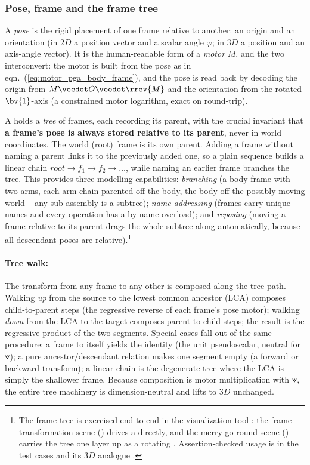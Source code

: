 \subsubsection{Pose, frame and the frame tree}
\label{subsubsection:pose_frame_tree}

A \emph{pose} is the rigid placement of one frame relative to another: an origin and an
orientation (in $2D$ a position vector and a scalar angle $\varphi$; in $3D$ a position
and an axis-angle vector). It is the human-readable form of a \emph{motor} $M$, and the
two interconvert: the motor is built from the pose as in
eqn.~(\ref{eq:motor_pga_body_frame}), and the pose is read back by decoding the origin
from $M \veedot O \veedot \rrev{M}$ and the orientation from the rotated $\bv{1}$-axis (a
constrained motor logarithm, exact on round-trip).

A  holds a \emph{tree} of frames, each recording its parent, with
the crucial invariant that \textbf{a frame's pose is always stored relative to its
parent}, never in world coordinates. The world (root) frame is its own parent. Adding a
frame without naming a parent links it to the previously added one, so a plain sequence
builds a linear chain $\textit{root} \to f_1 \to f_2 \to \dots$, while naming an earlier
frame branches the tree. This provides three modelling capabilities: \emph{branching}
(a body frame with two arms, each arm chain parented off the body, the body off the
possibly-moving world -- any sub-assembly is a subtree); \emph{name addressing} (frames
carry unique names and every operation has a by-name overload); and \emph{reposing}
(moving a frame relative to its parent drags the whole subtree along automatically,
because all descendant poses are relative).\footnote{The frame tree is exercised
end-to-end in the visualization tool : the frame-transformation scene
() drives a  directly, and the
merry-go-round scene () carries the tree one layer
up as a rotating . Assertion-checked usage is in the test cases
 and its $3D$ analogue
.}

\paragraph{Tree walk:} The transform from any frame to any other is composed along the
tree path. Walking
\emph{up} from the source to the lowest common ancestor (LCA) composes child-to-parent
steps (the regressive reverse of each frame's pose motor); walking \emph{down} from the
LCA to the target composes parent-to-child steps; the result is the regressive product of
the two segments. Special cases fall out of the same procedure: a frame to itself yields
the identity (the unit pseudoscalar, neutral for $\veedot$); a pure ancestor/descendant
relation makes one segment empty (a forward or backward transform); a linear chain is the
degenerate tree where the LCA is simply the shallower frame. Because composition is motor
multiplication with $\veedot$, the entire tree machinery is dimension-neutral and lifts to
$3D$ unchanged.

